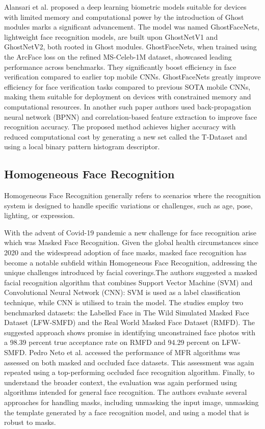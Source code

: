 Alansari et al. \cite{alansari_ghostfacenets_2023} proposed a deep learning biometric models suitable for devices with limited memory and computational power by the introduction of Ghost modules marks a significant advancement. The model was named GhostFaceNets, lightweight face recognition models, are built upon GhostNetV1 and GhostNetV2, both rooted in Ghost modules. GhostFaceNets, when trained using the ArcFace loss on the refined MS-Celeb-1M dataset, showcased leading performance across benchmarks. They significantly boost efficiency in face verification compared to earlier top mobile CNNs. GhostFaceNets greatly improve efficiency for face verification tasks compared to previous SOTA mobile CNNs, making them suitable for deployment on devices with constrained memory and computational resources. In another such paper \cite{abuzneid_enhanced_2018} authors used back-propagation neural network (BPNN) and correlation-based feature extraction to improve face recognition accuracy. The proposed method achieves higher accuracy with reduced computational cost by generating a new set called the T-Dataset and using a local binary pattern histogram descriptor.

\subsection{Homogeneous Face Recognition}

Homogeneous Face Recognition generally refers to scenarios where the recognition system is designed to handle specific variations or challenges, such as age, pose, lighting, or expression.

With the advent of Covid-19 pandemic a new challenge for face recognition arise which was Masked Face Recognition. Given the global health circumstances since 2020 and the widespread adoption of face masks, masked face recognition has become a notable subfield within Homogeneous Face Recognition, addressing the unique challenges introduced by facial coverings.The authors \cite{9914874} suggested a masked facial recognition algorithm that combines Support Vector Machine (SVM) and Convolutional Neural Network (CNN): SVM is used as a label classification technique, while CNN is utilised to train the model. The studies employ two benchmarked datasets: the Labelled Face in The Wild Simulated Masked Face Dataset (LFW-SMFD) and the Real World Masked Face Dataset (RMFD). The suggested approach shows promise in identifying unconstrained face photos with a 98.39 percent true acceptance rate on RMFD and 94.29 percent on LFW-SMFD. Pedro Neto et al. \cite{pedro_neto_beyond_2022} accessed the performance of MFR algorithms was assessed on both masked and occluded face datasets. This assessment was again repeated using a top-performing occluded face recognition algorithm. Finally, to understand the broader context, the evaluation was again performed using algorithms intended for general face recognition. The authors evaluate several approaches for handling masks, including unmasking the input image, unmasking the template generated by a face recognition model, and using a model that is robust to masks.


